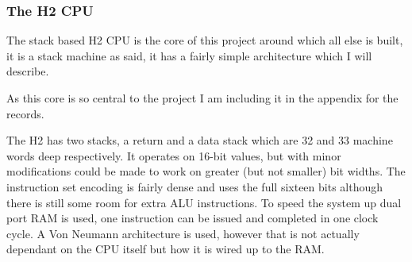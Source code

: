 \documentclass	[a4paper, 10pt]	{article}
\begin{document}
    \subsubsection{The H2 CPU}

    The stack based H2 CPU is the core of this project around which all else is built, it
    is a stack machine as said, it has a fairly simple architecture which I will describe.

    As this core is so central to the project I am including it in the appendix for the
    records.

    The H2 has two stacks, a return and a data stack which are 32 and 33 machine words deep
    respectively. It operates on 16-bit values, but with minor modifications could be made
    to work on greater (but not smaller) bit widths. The instruction set encoding is fairly
    dense and uses the full sixteen bits although there is still some room for extra ALU
    instructions. To speed the system up dual port RAM is used, one instruction can be
    issued and completed in one clock cycle. A Von Neumann architecture is used, however that
    is not actually dependant on the CPU itself but how it is wired up to the RAM. 
\end{document}

